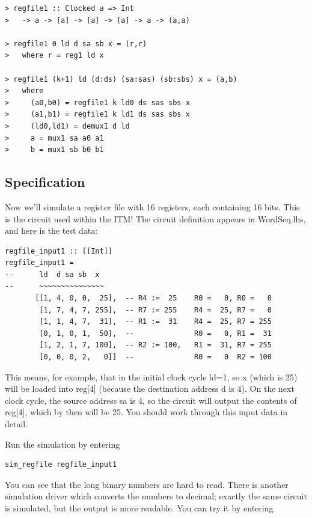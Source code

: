 \documentclass[a4paper,openany,fleqn]{book}
\begin{document}
\begin{verbatim}
> regfile1 :: Clocked a => Int
>   -> a -> [a] -> [a] -> [a] -> a -> (a,a)

> regfile1 0 ld d sa sb x = (r,r)
>   where r = reg1 ld x

> regfile1 (k+1) ld (d:ds) (sa:sas) (sb:sbs) x = (a,b)
>   where
>     (a0,b0) = regfile1 k ld0 ds sas sbs x
>     (a1,b1) = regfile1 k ld1 ds sas sbs x
>     (ld0,ld1) = demux1 d ld
>     a = mux1 sa a0 a1
>     b = mux1 sb b0 b1
\end{verbatim}

\subsection{Specification}
\label{sec:reg-file-spec}

Now we'll simulate a register file with 16 registers, each containing
16 bits.  This is the circuit used within the ITM!  The circuit
definition appears in WordSeq.lhs, and here is the test data:

\begin{verbatim}
regfile_input1 :: [[Int]]
regfile_input1 =
--      ld  d sa sb  x
--      ~~~~~~~~~~~~~~~
       [[1, 4, 0, 0,  25],  -- R4 :=  25    R0 =   0, R0 =   0
        [1, 7, 4, 7, 255],  -- R7 := 255    R4 =  25, R7 =   0
        [1, 1, 4, 7,  31],  -- R1 :=  31    R4 =  25, R7 = 255
        [0, 1, 0, 1,  50],  --              R0 =   0, R1 =  31
        [1, 2, 1, 7, 100],  -- R2 := 100,   R1 =  31, R7 = 255
        [0, 0, 0, 2,   0]]  --              R0 =   0  R2 = 100
\end{verbatim}

This means, for example, that in the initial clock cycle ld=1, so x
(which is 25) will be loaded into reg[4] (because the destination
address d is 4).  On the next clock cycle, the source address sa is 4,
so the circuit will output the contents of reg[4], which by then will
be 25.  You should work through this input data in detail.

Run the simulation by entering

\begin{verbatim}
sim_regfile regfile_input1
\end{verbatim}

You can see that the long binary numbers are hard to read.  There is
another simulation driver which converts the numbers to decimal;
exactly the same circuit is simulated, but the output is more
readable.  You can try it by entering
\end{document}
